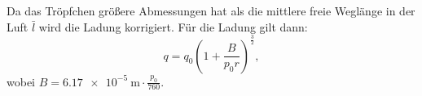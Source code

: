 Da das Tröpfchen größere Abmessungen hat als die mittlere
freie Weglänge in der Luft $\bar{l}$ wird die Ladung korrigiert.
Für die Ladung gilt dann:
\begin{equation}
  q = q_0 \left( 1 + \frac{B}{p_0 r} \right)^{\frac{3}{2}},
  \label{eqn:cunningham}
\end{equation}
wobei $B = \SI{6.17e-5}{\meter} \cdot \frac{p_0}{760}$.
